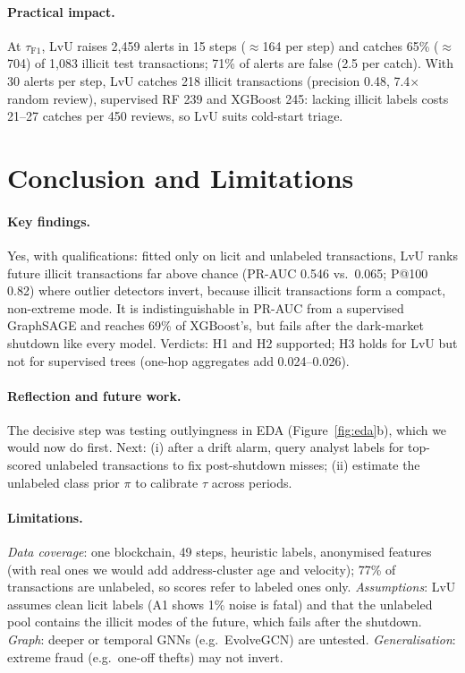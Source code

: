 \documentclass[11pt]{article}
\newcommand{\ours}{LvU}
\begin{document}
\paragraph{Practical impact.}
At $\tau_{\mathrm{F1}}$, \ours{} raises 2,459 alerts in 15 steps (${\approx}$164 per step) and catches 65\% (${\approx}$704) of 1,083 illicit test transactions; 71\% of alerts are false (2.5 per catch).
With 30 alerts per step, \ours{} catches 218 illicit transactions (precision 0.48, 7.4$\times$ random review), supervised RF 239 and XGBoost 245: lacking illicit labels costs 21--27 catches per 450 reviews, so \ours{} suits cold-start triage.

\section{Conclusion and Limitations}

\paragraph{Key findings.}
Yes, with qualifications: fitted only on licit and unlabeled transactions, \ours{} ranks future illicit transactions far above chance (PR-AUC 0.546 vs.\ 0.065; P@100 0.82) where outlier detectors invert, because illicit transactions form a compact, non-extreme mode.
It is indistinguishable in PR-AUC from a supervised GraphSAGE and reaches 69\% of XGBoost's, but fails after the dark-market shutdown like every model.
Verdicts: H1 and H2 supported; H3 holds for \ours{} but not for supervised trees (one-hop aggregates add 0.024--0.026).

\paragraph{Reflection and future work.}
The decisive step was testing outlyingness in EDA (Figure~\ref{fig:eda}b), which we would now do first.
Next: (i) after a drift alarm, query analyst labels for top-scored unlabeled transactions to fix post-shutdown misses; (ii) estimate the unlabeled class prior $\pi$ \citep{bekker2020pu} to calibrate $\tau$ across periods.

\paragraph{Limitations.}
\emph{Data coverage}: one blockchain, 49 steps, heuristic labels, anonymised features (with real ones we would add address-cluster age and velocity); 77\% of transactions are unlabeled, so scores refer to labeled ones only.
\emph{Assumptions}: \ours{} assumes clean licit labels (A1 shows 1\% noise is fatal) and that the unlabeled pool contains the illicit modes of the future, which fails after the shutdown.
\emph{Graph}: deeper or temporal GNNs (e.g.\ EvolveGCN) are untested.
\emph{Generalisation}: extreme fraud (e.g.\ one-off thefts) may not invert.
\end{document}
